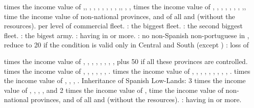  times the income value of
,,
, , ,
, , ,
,
,, ,
, 
 times the income value of ,
, , ,
, , ,
,, 
 time the income value of non-national provinces, and of all \COL and
\TP (without the resources).
 \VP per level of commercial fleet.
 \VPs: the biggest fleet.
 \VPs: the second biggest fleet.
 \VPs: the bigest army.
 \VPs: having  in \AM or more.
 \VPs: no non-Spanish non-portuguese \COL in ,
reduce to 20 \VP if the condition is valid only in Central and South
 (except )
 \VPs: loss of 

 times the income value of ,
, , ,
, , ,
, plus 50 \VPs if all these provinces are controlled.
 times the income value of ,
, , ,
, , .
 times the income value of ,
, , ,
, ,
, , ,
.
 times the income value of ,
, , .
\bparag Inheritance of Spanish Low-Lands: 3 times the income value of
, , ,
,  and 2 times the income value
of , 
 time the income value of non-national provinces, and of all \COL and
\TP (without the resources).
 \VPs: having  in \AM or more.

